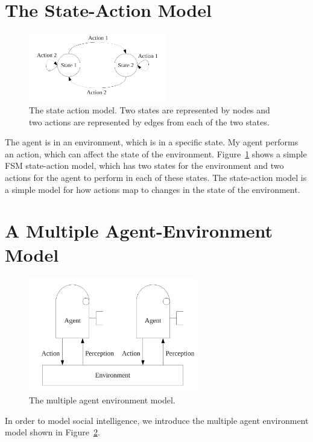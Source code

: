 \section{The State-Action Model}
\label{sec:state_action_model}

\begin{figure}[bth]
  \center
  \includegraphics[width=6cm]{gfx/state_action}
  \caption[The state-action model]{The state action model.  Two states
    are represented by nodes and two actions are represented by edges
    from each of the two states.}
  \label{fig:state_action}
\end{figure}

The agent is in an environment, which is in a specific state.  My
agent performs an action, which can affect the state of the
environment.  Figure~\ref{fig:state_action} shows a simple \ac{FSM}
state-action model, which has two states for the environment and two
actions for the agent to perform in each of these states.  The
state-action model is a simple model for how actions map to changes in
the state of the environment.


\section{A Multiple Agent-Environment Model}

\begin{figure}[bth]
  \center
  \includegraphics[height=5cm]{gfx/multiple_agent_environment}
  \caption[The multiple agent environment model]{The multiple agent environment model.}
  \label{fig:multiple_agent_environment}
\end{figure}

In order to model social intelligence, we introduce the multiple agent
environment model shown in
Figure~\ref{fig:multiple_agent_environment}.



